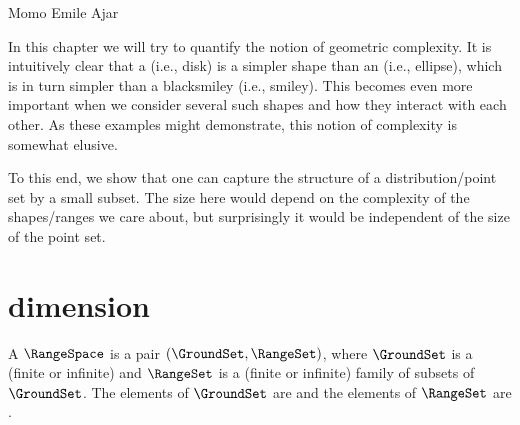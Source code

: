 % 

\makeatletter
{}
\makeatother
\ifx\bookMode\undefined%
\fi
{}


\ChapterPrefix{}
\ChapterGen{}


%
{Momo}%
{Emile Ajar}



\bigskip%
\noindent%
In this chapter we will try to quantify the notion of geometric
complexity. It is intuitively clear that a {\tiny \CircleSolid} (i.e.,
disk) is a simpler shape than an {\small \EllipseSolid} (i.e.,
ellipse), which is in turn simpler than a {blacksmiley} (i.e.,
smiley). This becomes even more important when we consider several
such shapes and how they interact with each other. As these examples
might demonstrate, this notion of complexity is somewhat elusive.

To this end, we show that one can capture the structure of a
distribution/point set by a small subset. The size here would depend
on the complexity of the shapes/ranges we care about, but surprisingly
it would be independent of the size of the point set.

\section{ dimension}

\begin{defn}
    A  $\RangeSpace$ is a pair
    $(\GroundSet,\RangeSet)$, where $\GroundSet$ is a  (finite or infinite) and $\RangeSet$ is a (finite or
    infinite) family of subsets of $\GroundSet$. The elements of
    $\GroundSet$ are  and the elements of $\RangeSet$
    are .
\end{defn}

